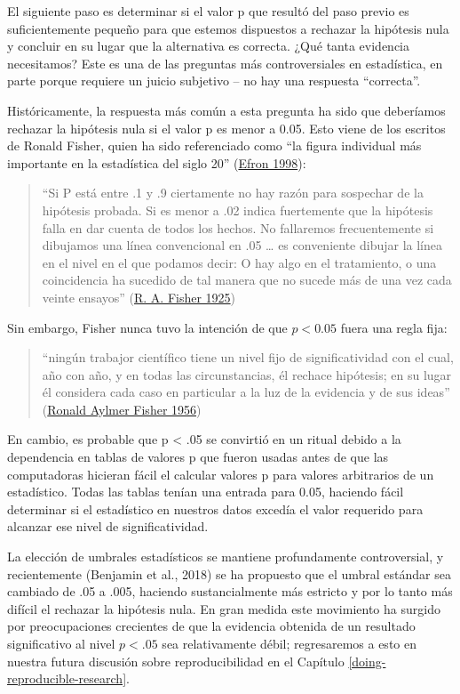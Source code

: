 \documentclass[
  12pt,
]{book}
\begin{document}
El siguiente paso es determinar si el valor p que resultó del paso previo es suficientemente pequeño para que estemos dispuestos a rechazar la hipótesis nula y concluir en su lugar que la alternativa es correcta. ¿Qué tanta evidencia necesitamos? Este es una de las preguntas más controversiales en estadística, en parte porque requiere un juicio subjetivo -- no hay una respuesta ``correcta''.

Históricamente, la respuesta más común a esta pregunta ha sido que deberíamos rechazar la hipótesis nula si el valor p es menor a 0.05. Esto viene de los escritos de Ronald Fisher, quien ha sido referenciado como ``la figura individual más importante en la estadística del siglo 20'' (\protect\hyperlink{ref-efron1998}{Efron 1998}):

\begin{quote}
``Si P está entre .1 y .9 ciertamente no hay razón para sospechar de la hipótesis probada. Si es menor a .02 indica fuertemente que la hipótesis falla en dar cuenta de todos los hechos. No fallaremos frecuentemente si dibujamos una línea convencional en .05 \ldots{} es conveniente dibujar la línea en el nivel en el que podamos decir: O hay algo en el tratamiento, o una coincidencia ha sucedido de tal manera que no sucede más de una vez cada veinte ensayos'' (\protect\hyperlink{ref-fisher1925statistical}{R. A. Fisher 1925})
\end{quote}

Sin embargo, Fisher nunca tuvo la intención de que \(p < 0.05\) fuera una regla fija:

\begin{quote}
``ningún trabajor científico tiene un nivel fijo de significatividad con el cual, año con año, y en todas las circunstancias, él rechace hipótesis; en su lugar él considera cada caso en particular a la luz de la evidencia y de sus ideas'' (\protect\hyperlink{ref-fish:1956}{Ronald Aylmer Fisher 1956})
\end{quote}

En cambio, es probable que p \textless{} .05 se convirtió en un ritual debido a la dependencia en tablas de valores p que fueron usadas antes de que las computadoras hicieran fácil el calcular valores p para valores arbitrarios de un estadístico. Todas las tablas tenían una entrada para 0.05, haciendo fácil determinar si el estadístico en nuestros datos excedía el valor requerido para alcanzar ese nivel de significatividad.

La elección de umbrales estadísticos se mantiene profundamente controversial, y recientemente (Benjamin et al., 2018) se ha propuesto que el umbral estándar sea cambiado de .05 a .005, haciendo sustancialmente más estricto y por lo tanto más difícil el rechazar la hipótesis nula. En gran medida este movimiento ha surgido por preocupaciones crecientes de que la evidencia obtenida de un resultado significativo al nivel \(p < .05\) sea relativamente débil; regresaremos a esto en nuestra futura discusión sobre reproducibilidad en el Capítulo \ref{doing-reproducible-research}.
\end{document}
